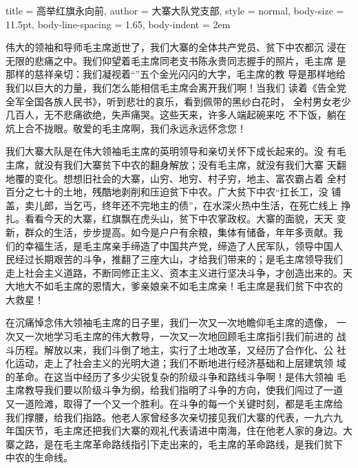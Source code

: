 \begin{hongqiarticle}{
        title  = {高举红旗永向前},
        author = {大寨大队党支部},
        style  = normal,
        body-size = 11.5pt,
        body-line-spacing = 1.65,
        body-indent = 2em
    }
    
    伟大的领袖和导师毛主席逝世了，我们大寨的全体共产党员、贫下中农都沉
    浸在无限的悲痛之中。我们仰望着毛主席同老支书陈永贵同志握手的照片，毛主席
    是那样的慈祥亲切：我们凝视着“”五个金光闪闪的大字，毛主席的教
    导是那样地给我们以巨大的力量，我们怎么能相信毛主席会离开我们啊！当我们
    读着《告全党全军全国各族人民书》，听到悲壮的哀乐，看到佩带的黑纱白花时，
    全村男女老少几百人，无不悲痛欲绝，失声痛哭。这些天来，许多人端起碗来吃
    不下饭，躺在炕上合不拢眼。敬爱的毛主席啊，我们永远永远怀念您！
    
    我们大寨大队是在伟大领袖毛主席的英明领导和亲切关怀下成长起来的。没
    有毛主席，就没有我们大寨贫下中农的翻身解放；没有毛主席，就没有我们大寨
    天翻地覆的变化。想想旧社会的大寨，山穷、地穷、村子穷，地主、富农霸占着
    全村百分之七十的土地，残酷地剥削和压迫贫下中农。广大贫下中农“扛长工，没
    铺盖，卖儿郎，当乞丐，终年还不完地主的债”，在水深火热中生活，在死亡线上
    挣扎。看看今天的大寨，红旗飘在虎头山，贫下中农掌政权。大寨的面貌，天天
    变新，群众的生活，步步提高。如今是户户有余粮，集体有储备，年年多贡献。我
    们的幸福生活，是毛主席亲手缔造了中国共产党，缔造了人民军队，领导中国人
    民经过长期艰苦的斗争，推翻了三座大山，才给我们带来的；是毛主席领导我们
    走上社会主义道路，不断同修正主义、资本主义进行坚决斗争，才创造出来的。天
    大地大不如毛主席的恩情大，爹亲娘亲不如毛主席亲！毛主席是我们贫下中农的
    大救星！
    
    在沉痛悼念伟大领袖毛主席的日子里，我们一次又一次地瞻仰毛主席的遗像，
    一次又一次地学习毛主席的伟大教导，一次又一次地回顾毛主席指引我们前进的
    战斗历程。解放以来，我们斗倒了地主，实行了土地改革，又经历了合作化、公
    社化运动，走上了社会主义的光明大道；我们不断地进行经济基础和上层建筑领
    域的革命。在这当中经历了多少尖锐复杂的阶级斗争和路线斗争啊！是伟大领袖
    毛主席教导我们要以阶级斗争为纲，给我们指明了斗争的方向，使我们闯过了一道
    又一道险滩，取得了一个又一个胜利。在斗争的每一个关键时刻，都是毛主席给
    我们撑腰，给我们指路。他老人家曾经多次亲切接见我们大寨的代表，一九六九
    年国庆节，毛主席还把我们大寨的观礼代表请进中南海，住在他老人家的身边。大
    寨之路，是在毛主席革命路线指引下走出来的，毛主席的革命路线，是我们贫下
    中农的生命线。
    

\end{hongqiarticle}
